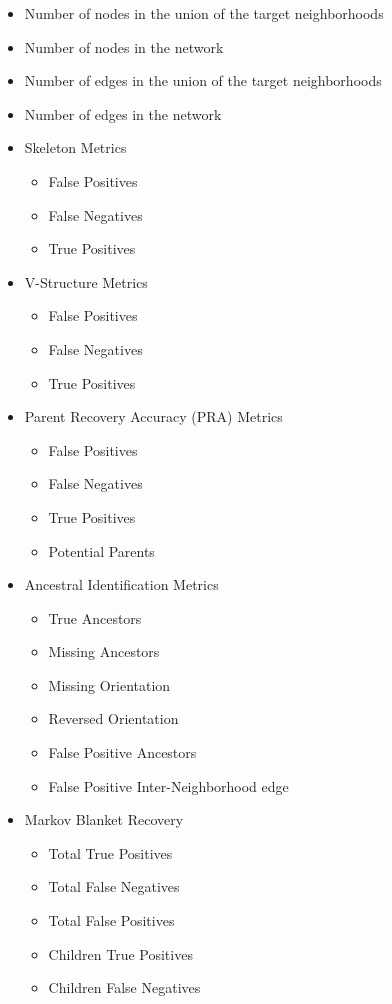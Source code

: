 \documentclass[12pt]{article}\usepackage[]{graphicx}\usepackage[]{color}
\begin{document}
\begin{itemize}
\item Number of nodes in the union of the target neighborhoods
\item Number of nodes in the network
\item Number of edges in the union of the target neighborhoods
\item Number of edges in the network
\item Skeleton Metrics
\begin{itemize}
\item False Positives
\item False Negatives
\item True Positives
\end{itemize}
\item V-Structure Metrics
\begin{itemize}
\item False Positives
\item False Negatives
\item True Positives
\end{itemize}
\item Parent Recovery Accuracy (PRA) Metrics
\begin{itemize}
\item False Positives
\item False Negatives
\item True Positives
\item Potential Parents
\end{itemize}
\item Ancestral Identification Metrics
\begin{itemize}
\item True Ancestors
\item Missing Ancestors
\item Missing Orientation
\item Reversed Orientation
\item False Positive Ancestors
\item False Positive Inter-Neighborhood edge
\end{itemize}
\item Markov Blanket Recovery
\begin{itemize}
\item Total True Positives
\item Total False Negatives
\item Total False Positives
\item Children True Positives
\item Children False Negatives

\end{itemize}
\end{itemize}
\end{document}
